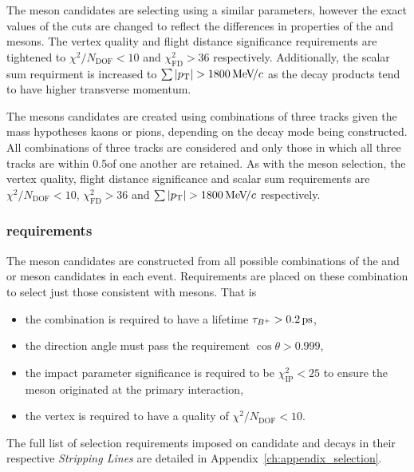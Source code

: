 The \Dzb meson candidates are selecting using a similar parameters, however the exact values of the cuts are changed to reflect the differences in properties of the \phiz and \Dzb mesons. The vertex quality and flight distance significance requirements are tightened to $\chi^{2}/N_{\text{DOF}} < 10$ and $\chi^{2}_{\text{FD} }  > 36$ respectively. Additionally, the scalar \pt sum requirment is increased to $\sum{|\pt|} > 1800 \mevc$ as the decay products tend to have higher transverse momentum. 


The \Dsp mesons candidates are created using combinations of three tracks given the mass hypotheses kaons or pions, depending on the decay mode being constructed. All combinations of three tracks are considered and only those in which all three tracks are within 0.5\mm of one another are retained. As with the \Dzb meson selection, the vertex quality, flight distance significance and scalar \pt sum requirements are $\chi^{2}/N_{\text{DOF}} < 10$, $\chi^{2}_{\text{FD} }  > 36$ and $\sum{|\pt|} > 1800 \mevc$ respectively.

\subsubsection{\Bp requirements}
The \Bp meson candidates are constructed from all possible combinations of the \Dsp and \phiz or \Dzb meson candidates in each event.
Requirements are placed on these combination to select just those consistent with \Bp mesons.
That is
\begin{itemize}
\item the combination is required to have a lifetime $\tau_{{{{B}^+}}} > 0.2{\mathrm{ \,ps}}$, 
\item the direction angle must pass the requirement $\cos{\theta}>0.999$,
\item the impact parameter significance is required to be $\chi^{2}_{\text{IP}} < 25$ to ensure the \Bp meson originated at the primary interaction, 
\item the vertex is required to have a quality of $\chi^{2}/N_{\text{DOF}} < 10$. 
\end{itemize}
The full list of selection requirements imposed on candidate \decay{\Bp}{\Dsp\phiz} and \decay{\Bp}{\Dsp\Kp\Km} decays in their respective \emph{Stripping Lines} are detailed in Appendix~\ref{ch:appendix_selection}. 



